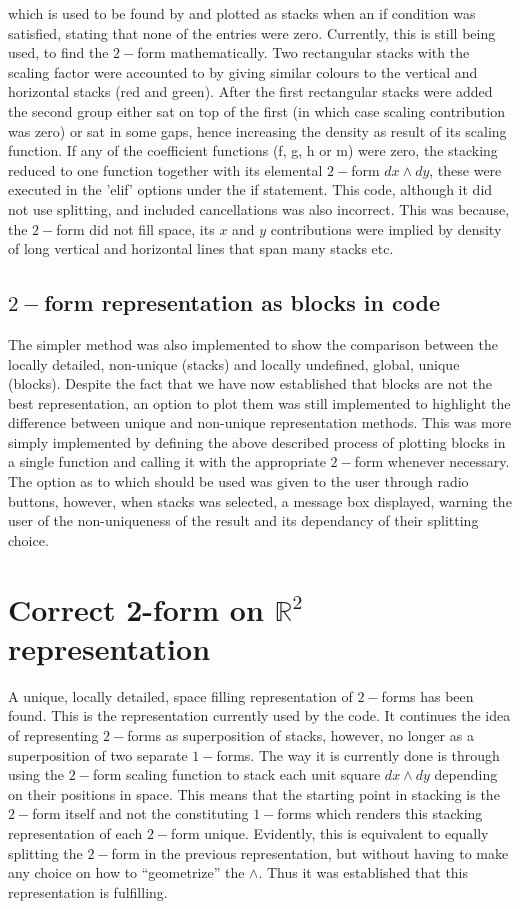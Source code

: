 \documentclass[12pt]{report}
\begin{document}
which is used to be found by and plotted as stacks when an if condition was satisfied, stating that none of the entries were zero. Currently, this is still being used, to find the $2 -$form mathematically.
Two rectangular stacks with the scaling factor were accounted to by giving similar colours to the vertical  and horizontal stacks (red and green). After the first rectangular stacks were added the second group either sat on top of the first (in which case scaling contribution was zero) or sat in some gaps, hence increasing the density as result of its scaling function.
If any of the coefficient functions (f, g, h or m) were zero, the stacking reduced to one function together with its elemental $2-$form $dx\wedge dy$, these were executed in the 'elif' options under the if statement. This code, although it did not use splitting, and included cancellations was also incorrect. This was because, the $2-$form did not fill space, its $x$ and $y$ contributions were implied by density of long vertical and horizontal lines that span many stacks etc.


\subsection{$2-$form representation as blocks in code}
The simpler method was also implemented to show the comparison between the locally detailed, non-unique (stacks) and locally undefined, global, unique (blocks). Despite the fact that we have now established that blocks are not the best representation, an option to plot them was still implemented to highlight the difference between unique and non-unique representation methods. 
This was more simply implemented by defining the above described process of plotting blocks in a single function and calling it with the appropriate $2-$form whenever necessary.
The option as to which should be used was given to the user through radio buttons, however, when stacks was selected, a message box displayed, warning the user of the non-uniqueness of the result and its dependancy of their splitting choice.

\section{Correct 2-form on $\mathbb{R}^{2}$ representation}
A unique, locally detailed, space filling representation of $2-$forms has been found. This is the representation currently used by the code. It continues the idea of representing $2-$forms as superposition of stacks, however, no longer as a superposition of two separate $1-$forms. The way it is currently done is through using the $2-$form scaling function to stack each unit square $dx\wedge dy$ depending on their positions in space. This means that the starting point in stacking is the $2-$form itself and not the constituting $1-$forms which renders this stacking representation of each $2-$form unique. Evidently, this is equivalent to equally splitting the $2-$form in the previous representation, but without having to make any choice on how to ``geometrize'' the $\wedge$. Thus it was established that this representation is fulfilling.
\end{document}
